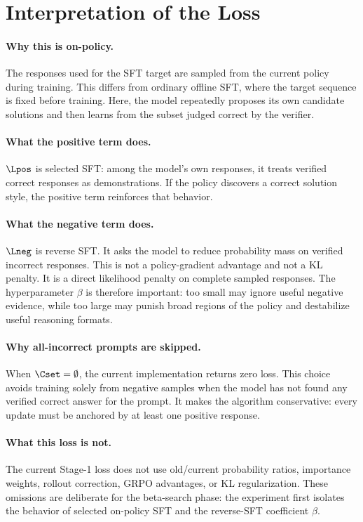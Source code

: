 \section{Interpretation of the Loss}
\label{sec:opsft-interpretation}

\paragraph{Why this is on-policy.}
The responses used for the SFT target are sampled from the current policy
during training. This differs from ordinary offline SFT, where the target
sequence is fixed before training. Here, the model repeatedly proposes its own
candidate solutions and then learns from the subset judged correct by the
verifier.

\paragraph{What the positive term does.}
$\Lpos$ is selected SFT: among the model's own responses, it treats verified
correct responses as demonstrations. If the policy discovers a correct solution
style, the positive term reinforces that behavior.

\paragraph{What the negative term does.}
$\Lneg$ is reverse SFT. It asks the model to reduce probability mass on
verified incorrect responses. This is not a policy-gradient advantage and not
a KL penalty. It is a direct likelihood penalty on complete sampled responses.
The hyperparameter $\beta$ is therefore important: too small may ignore useful
negative evidence, while too large may punish broad regions of the policy and
destabilize useful reasoning formats.

\paragraph{Why all-incorrect prompts are skipped.}
When $\Cset=\emptyset$, the current implementation returns zero loss. This
choice avoids training solely from negative samples when the model has not
found any verified correct answer for the prompt. It makes the algorithm
conservative: every update must be anchored by at least one positive response.

\paragraph{What this loss is not.}
The current Stage-1 loss does not use old/current probability ratios,
importance weights, rollout correction, GRPO advantages, or KL regularization.
These omissions are deliberate for the beta-search phase: the experiment first
isolates the behavior of selected on-policy SFT and the reverse-SFT coefficient
$\beta$.

